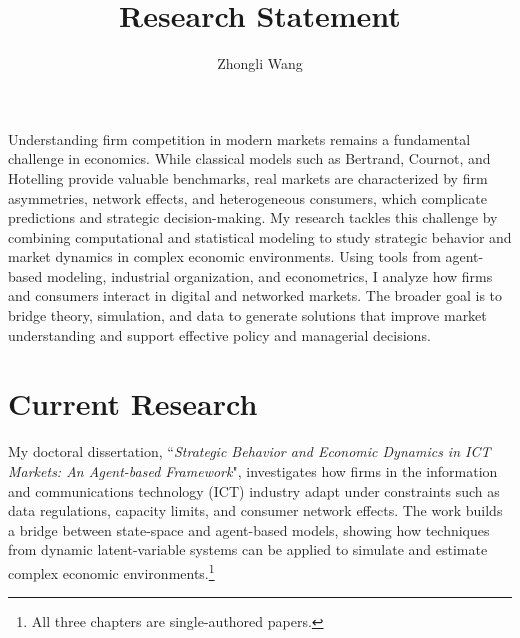 \documentclass{nfr}
\title{Research Statement}
\author{Zhongli Wang}
\begin{document}

% 
% 
% 
% 


\maketitle

Understanding firm competition in modern markets remains a fundamental challenge in economics. 
While classical models such as Bertrand, Cournot, and Hotelling provide valuable benchmarks, real markets are characterized by firm asymmetries, network effects, and heterogeneous consumers, which complicate predictions and strategic decision-making. %
My research tackles this challenge by combining computational and statistical modeling to study strategic behavior and market dynamics in complex economic environments. Using tools from agent-based modeling, industrial organization, and econometrics, I analyze how firms and consumers interact in digital and networked markets. The broader goal is to bridge theory, simulation, and data to generate solutions that improve market understanding and support effective policy and managerial decisions.

\section*{Current Research}


My doctoral dissertation, ``\textit{Strategic Behavior and Economic Dynamics in ICT Markets: An Agent-based Framework}", investigates how firms in the information and communications technology (ICT) industry adapt under constraints such as data regulations, capacity limits, and consumer network effects. The work builds a bridge between state-space and agent-based models, showing how techniques from dynamic latent-variable systems can be applied to simulate and estimate complex economic environments.\footnote{All three chapters are single-authored papers.}\\
\end{document}
